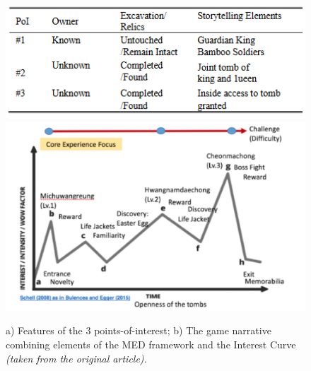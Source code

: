 \documentclass[runningheads]{llncs}
\begin{document}
\begin{figure}
    \centering
    \includegraphics[scale = 0.50]{PoIs.png}
    \includegraphics[scale = 0.50]{Schell.png}
    \caption{a) Features of the 3 points-of-interest; b) The game narrative combining elements of the MED framework and the Interest Curve \textit{(taken from the original article).}}
    \label{fig:POI}
\end{figure}
\end{document}
